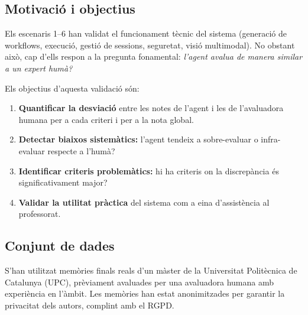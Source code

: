\documentclass[12pt,a4paper,twoside]{report}
\begin{document}
\subsection{Motivaci\'o i objectius}

Els escenaris 1--6 han validat el funcionament t\`ecnic del sistema (generaci\'o de workflows, execuci\'o, gesti\'o de sessions, seguretat, visi\'o multimodal). No obstant aix\`o, cap d'ells respon a la pregunta fonamental: \textit{l'agent avalua de manera similar a un expert hum\`a?}

Els objectius d'aquesta validaci\'o s\'on:

\begin{enumerate}
    \item \textbf{Quantificar la desviaci\'o} entre les notes de l'agent i les de l'avaluadora humana per a cada criteri i per a la nota global.
    \item \textbf{Detectar biaixos sistem\`atics:} l'agent tendeix a sobre-evaluar o infra-evaluar respecte a l'hum\`a?
    \item \textbf{Identificar criteris problem\`atics:} hi ha criteris on la discrep\`ancia \'es significativament major?
    \item \textbf{Validar la utilitat pr\`actica} del sistema com a eina d'assist\`encia al professorat.
\end{enumerate}

\subsection{Conjunt de dades}

S'han utilitzat mem\`ories finals reals d'un m\`aster de la Universitat Polit\`ecnica de Catalunya (UPC), pr\`eviament avaluades per una avaluadora humana amb experi\`encia en l'\`ambit. Les mem\`ories han estat anonimitzades per garantir la privacitat dels autors, complint amb el RGPD.
\end{document}
